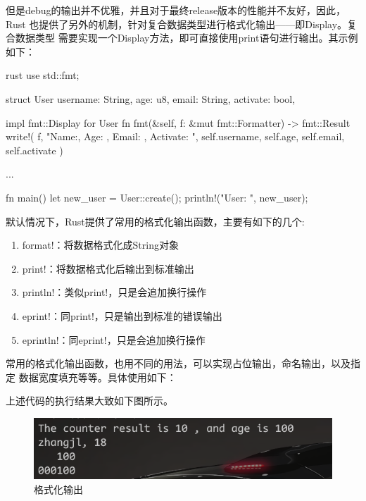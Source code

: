 但是debug的输出并不优雅，并且对于最终release版本的性能并不友好，因此，Rust
也提供了另外的机制，针对复合数据类型进行格式化输出——即Display。复合数据类型
需要实现一个Display方法，即可直接使用print语句进行输出。其示例如下：
\begin{code-block}{rust}
use std::fmt;

struct User {
    username: String,
    age: u8,
    email: String,
    activate: bool,
}

impl fmt::Display for User {
    fn fmt(&self, f: &mut fmt::Formatter) -> fmt::Result {
        write!(
            f,
            "Name:{}, Age: {}, Email: {}, Activate: {}",
            self.username, self.age, self.email, self.activate
        )
    }
}

...

fn main() {
    let new_user = User::create();
    println!("User: {}", new_user);
}
\end{code-block}

默认情况下，Rust提供了常用的格式化输出函数，主要有如下的几个:
\begin{enumerate}
  \item format!：将数据格式化成String对象
  \item print!：将数据格式化后输出到标准输出
  \item println!：类似print!，只是会追加换行操作
  \item eprint!：同print!，只是输出到标准的错误输出
  \item eprintln!：同eprint!，只是会追加换行操作
\end{enumerate}
常用的格式化输出函数，也用不同的用法，可以实现占位输出，命名输出，以及指定
数据宽度填充等等。具体使用如下：
上述代码的执行结果大致如下图所示。
\begin{figure}[H]
  \centering
  \includegraphics[scale=0.2]{rust_format.png}
  \caption{格式化输出}
  \label{fig:rust_format}
\end{figure}

